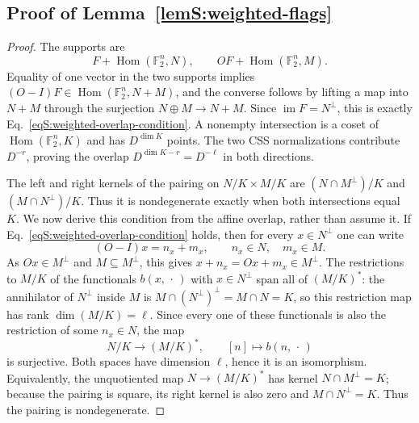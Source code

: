 \documentclass[journal,twocolumn]{IEEEtran}
\theoremstyle{definition}
\theoremstyle{plain}
\newcommand{\F}{\mathbb F}
\begin{document}
\subsection{Proof of Lemma~\ref{lemS:weighted-flags}}
\label{app:proof-weighted-flags}

\begin{proof}
The supports are
\begin{equation}
 F+\operatorname{Hom}(\F_2^n,N),\qquad
 OF+\operatorname{Hom}(\F_2^n,M).
\end{equation}
Equality of one vector in the two supports implies
$(O-I)F\in\operatorname{Hom}(\F_2^n,N+M)$, and the converse follows by
lifting a map into $N+M$ through the surjection $N\oplus M\to N+M$.
Since $\operatorname{im}F=N^\perp$, this is exactly
Eq.~\eqref{eqS:weighted-overlap-condition}.  A nonempty intersection is a
coset of $\operatorname{Hom}(\F_2^n,K)$ and has $D^{\dim K}$ points.
The two CSS normalizations contribute $D^{-r}$, proving the overlap
$D^{\dim K-r}=D^{-\ell}$ in both directions.

The left and right kernels of the pairing on $N/K\times M/K$ are
$(N\cap M^\perp)/K$ and $(M\cap N^\perp)/K$.  Thus it is nondegenerate
exactly when both intersections equal $K$.  We now derive this condition
from the affine overlap, rather than assume it.  If
Eq.~\eqref{eqS:weighted-overlap-condition} holds, then for every
$x\in N^\perp$ one can write
\begin{equation}
 (O-I)x=n_x+m_x,\qquad n_x\in N,\quad m_x\in M.
\end{equation}
As $Ox\in M^\perp$ and $M\subseteq M^\perp$, this gives
$x+n_x=Ox+m_x\in M^\perp$.  The restrictions to $M/K$ of the functionals
$b(x,\,\cdot\,)$ with $x\in N^\perp$ span all of $(M/K)^*$: the
annihilator of $N^\perp$ inside $M$ is
$M\cap(N^\perp)^\perp=M\cap N=K$, so this restriction map has rank
$\dim(M/K)=\ell$.  Since every one of these functionals is also the
restriction of some $n_x\in N$, the map
\begin{equation}
N/K\longrightarrow(M/K)^*,\qquad[n]\longmapsto b(n,\,\cdot\,)
\end{equation}
is surjective.  Both spaces have dimension $\ell$, hence it is an
isomorphism.  Equivalently, the unquotiented map $N\to(M/K)^*$ has kernel
$N\cap M^\perp=K$; because the pairing is square, its right kernel is also
zero and $M\cap N^\perp=K$.  Thus the pairing is nondegenerate.


\end{proof}
\end{document}
